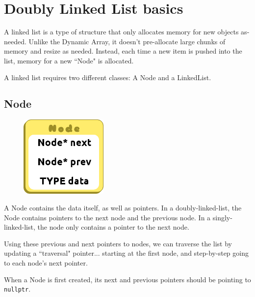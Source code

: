\documentclass[a4paper,12pt,oneside]{book}
\begin{document}
    \tableofcontents

    \newpage
    \chapter{Doubly Linked List basics}

        A linked list is a type of structure that only allocates memory for new objects as-needed.
        Unlike the Dynamic Array, it doesn't pre-allocate large chunks of memory and resize as 
        needed. Instead, each time a new item is pushed into the list, memory for a new ``Node" 
        is allocated.

        A linked list requires two different classes: A Node and a LinkedList.

    \section{Node}
        
        \begin{figure}
        \includegraphics[height=4cm]{images/justanode.png}
        \end{figure}
    
        A Node contains the data itself, as well as pointers. In a doubly-linked-list, 
        the Node contains pointers to the next node and the previous node.
        In a singly-linked-list, the node only contains a pointer to the next node.

        Using these previous and next pointers to nodes, we can traverse the list by updating 
        a ``traversal" pointer... starting at the first node, and step-by-step going 
        to each node's next pointer.
        
        When a Node is first created, its next and previous pointers should
        be pointing to \texttt{nullptr}.
        
\end{document}
